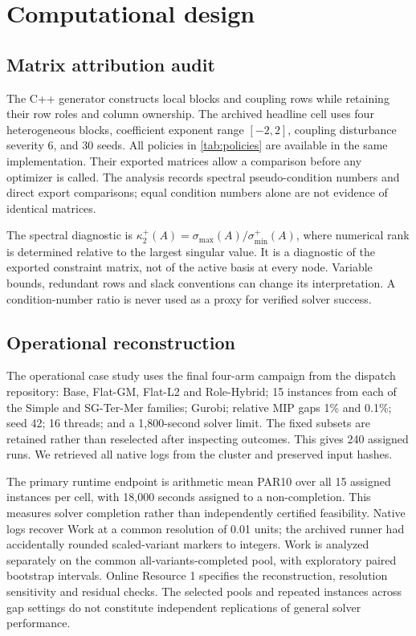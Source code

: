 \documentclass[11pt]{article}
\theoremstyle{definition}
\theoremstyle{remark}
\begin{document}
\section{Computational design}
\label{sec:experiments}
\subsection{Matrix attribution audit}
The C++ generator constructs local blocks and coupling rows while retaining their row
roles and column ownership. The archived headline cell uses four heterogeneous blocks,
coefficient exponent range $[-2,2]$, coupling disturbance severity $6$, and 30 seeds.
All policies in \cref{tab:policies} are available in the same implementation. Their
exported matrices allow a comparison before any optimizer is called. The analysis
records spectral pseudo-condition numbers and direct export comparisons; equal
condition numbers alone are not evidence of identical matrices.

The spectral diagnostic is $\kappa_2^+(A)=\sigma_{\max}(A)/\sigma_{\min}^+(A)$,
where numerical rank is determined relative to the largest singular value. It is a
diagnostic of the exported constraint matrix, not of the active basis at every node.
Variable bounds, redundant rows and slack conventions can change its interpretation.
A condition-number ratio is never used as a proxy for verified solver success.

\subsection{Operational reconstruction}
The operational case study uses the final four-arm campaign from the dispatch
repository: Base, Flat-GM, Flat-L2 and Role-Hybrid; 15 instances from each of the
Simple and SG-Ter-Mer families; Gurobi; relative MIP gaps 1\% and 0.1\%; seed 42;
16 threads; and a 1,800-second solver limit. The fixed subsets are retained rather
than reselected after inspecting outcomes. This gives 240 assigned runs. We retrieved
all native logs from the cluster and preserved input hashes.

The primary runtime endpoint is arithmetic mean PAR10 over all 15 assigned instances
per cell, with 18,000 seconds assigned to a non-completion. This measures solver
completion rather than independently certified feasibility. Native logs recover Work
at a common resolution of 0.01 units; the archived runner had accidentally rounded
scaled-variant markers to integers. Work is analyzed separately on the common
all-variants-completed pool, with exploratory paired bootstrap intervals. Online
Resource 1 specifies the reconstruction, resolution sensitivity and residual checks.
The selected pools and repeated instances across gap settings do not constitute
independent replications of general solver performance.
\end{document}
